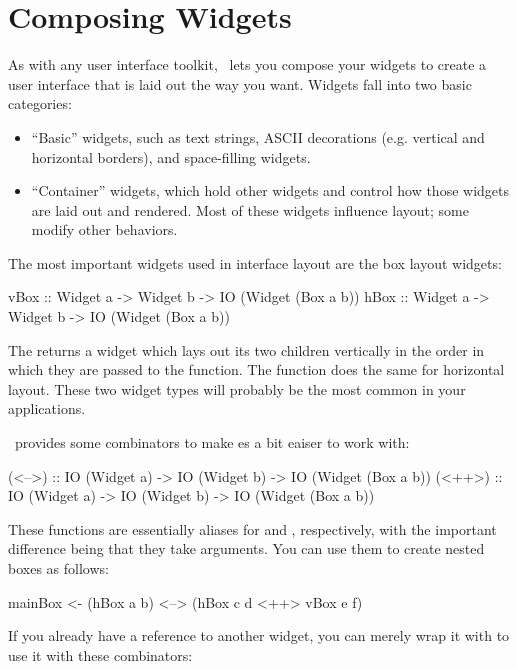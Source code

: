 \section{Composing Widgets}

As with any user interface toolkit, \vtyui\ lets you compose your
widgets to create a user interface that is laid out the way you want.
Widgets fall into two basic categories:

\begin{itemize}
\item ``Basic'' widgets, such as text strings, ASCII decorations
  (e.g. vertical and horizontal borders), and space-filling widgets.
\item ``Container'' widgets, which hold other widgets and control how
  those widgets are laid out and rendered.  Most of these widgets
  influence layout; some modify other behaviors.
\end{itemize}

The most important widgets used in interface layout are the box layout
widgets:

\begin{haskellcode}
 vBox :: Widget a -> Widget b -> IO (Widget (Box a b))
 hBox :: Widget a -> Widget b -> IO (Widget (Box a b))
\end{haskellcode}

The  returns a  widget which lays out its two
children vertically in the order in which they are passed to the
function.  The  function does the same for horizontal layout.
These two widget types will probably be the most common in your
applications.

\vtyui\ provides some combinators to make es a bit eaiser to
work with:

\begin{haskellcode}
 (<-->) :: IO (Widget a) -> IO (Widget b) -> IO (Widget (Box a b))
 (<++>) :: IO (Widget a) -> IO (Widget b) -> IO (Widget (Box a b))
\end{haskellcode}

These functions are essentially aliases for  and ,
respectively, with the important difference being that they take
 arguments.  You can use them to create nested boxes as
follows:

\begin{haskellcode}
 mainBox <- (hBox a b) <--> (hBox c d <++> vBox e f)
\end{haskellcode}

If you already have a reference to another widget, you can merely wrap
it with  to use it with these combinators:

